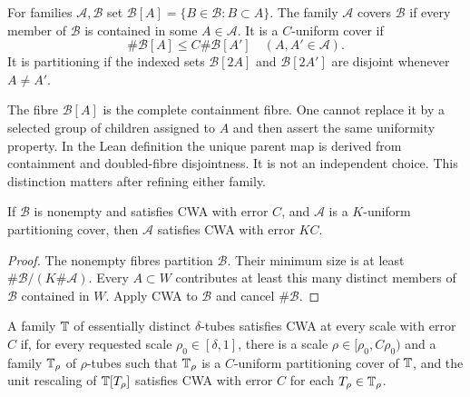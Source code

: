 \begin{definition}
\label{def:partition-cover}
\leanok
{}
For families $\mathcal A,\mathcal B$ set
$\mathcal B[A]=\{B\in\mathcal B:B\subset A\}$.
The family $\mathcal A$ covers $\mathcal B$ if every member of
$\mathcal B$ is contained in some $A\in\mathcal A$. It is a
$C$-uniform cover if
\[
 \#\mathcal B[A]\leq C\#\mathcal B[A']\quad(A,A'\in\mathcal A).
\]
It is partitioning if the indexed sets $\mathcal B[2A]$ and
$\mathcal B[2A']$ are disjoint whenever $A\ne A'$.
\end{definition}

\begin{remark}
\label{rem:full-fibres}
The fibre $\mathcal B[A]$ is the complete containment fibre. One cannot
replace it by a selected group of children assigned to $A$ and then
assert the same uniformity property. In the Lean definition the unique
parent map is derived from containment and doubled-fibre disjointness.
It is not an independent choice. This distinction matters after
refining either family.
\end{remark}

\begin{lemma}
\label{lem:cover-cwa}
If $\mathcal B$ is nonempty and satisfies CWA with error $C$, and
$\mathcal A$ is a $K$-uniform partitioning cover, then $\mathcal A$
satisfies CWA with error $KC$.
\end{lemma}
\begin{proof}
The nonempty fibres partition $\mathcal B$. Their minimum size is at
least $\#\mathcal B/(K\#\mathcal A)$. Every $A\subset W$ contributes
at least this many distinct members of $\mathcal B$ contained in $W$.
Apply CWA to $\mathcal B$ and cancel $\#\mathcal B$.
\end{proof}

\begin{definition}
\label{def:all-scale-cwa}
\leanok
{}
A family $\mathbb{T}$ of essentially distinct $\delta$-tubes satisfies CWA at
every scale with error $C$ if, for every requested scale
$\rho_0\in[\delta,1]$, there is a scale
$\rho\in[\rho_0,C\rho_0)$ and a family $\mathbb{T}_\rho$ of $\rho$-tubes such
that $\mathbb{T}_\rho$ is a $C$-uniform partitioning cover of $\mathbb{T}$, and the
unit rescaling of $\mathbb{T}[T_\rho]$ satisfies CWA with error $C$ for each
$T_\rho\in\mathbb{T}_\rho$.
\end{definition}

